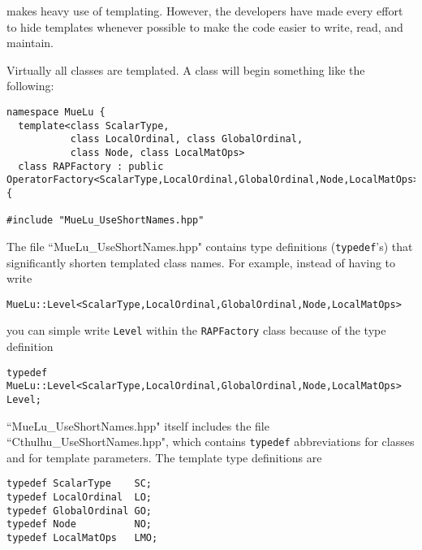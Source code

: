 \muelu makes heavy use of templating.  However, the developers have made every effort to hide templates
whenever possible to make the code easier to write, read, and maintain.

Virtually all \muelu classes are templated.  A class will begin something like the following:

\begin{verbatim}
namespace MueLu {
  template<class ScalarType,
           class LocalOrdinal, class GlobalOrdinal,
           class Node, class LocalMatOps>
  class RAPFactory : public OperatorFactory<ScalarType,LocalOrdinal,GlobalOrdinal,Node,LocalMatOps> {

#include "MueLu_UseShortNames.hpp"
\end{verbatim}
%
The file ``MueLu\_UseShortNames.hpp" contains type definitions (\verb!typedef!'s) that significantly shorten
templated class names.  For example, instead of having to write
\begin{verbatim}
MueLu::Level<ScalarType,LocalOrdinal,GlobalOrdinal,Node,LocalMatOps>
\end{verbatim}
you can simple write \verb!Level!  within the \verb!RAPFactory! class because of the type definition
\begin{verbatim}
typedef MueLu::Level<ScalarType,LocalOrdinal,GlobalOrdinal,Node,LocalMatOps> Level;
\end{verbatim}
``MueLu\_UseShortNames.hpp" itself includes the file ``Cthulhu\_UseShortNames.hpp", which contains
\verb!typedef! abbreviations for \cthulhu classes and for template parameters.  The template
type definitions are
%
\begin{verbatim}
typedef ScalarType    SC;
typedef LocalOrdinal  LO;
typedef GlobalOrdinal GO;
typedef Node          NO;
typedef LocalMatOps   LMO;
\end{verbatim}
